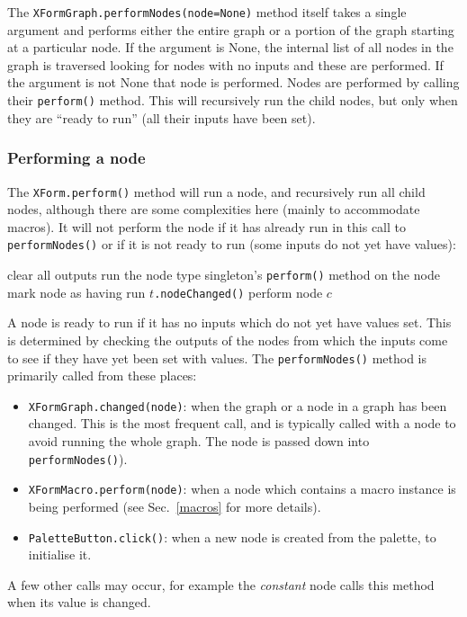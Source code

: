 The \texttt{XFormGraph.performNodes(node=None)} method itself takes a single
argument and performs either the entire graph or a portion of the graph
starting at a particular node. If the argument is None, the internal list of
all nodes in the graph is traversed looking for nodes with no inputs and these
are performed. If the argument is not None that node is performed. Nodes are
performed by calling their \texttt{perform()} method. This will recursively
run the child nodes, but only when they are ``ready to run'' (all their inputs
have been set). 

\subsubsection{Performing a node}
The \texttt{XForm.perform()} method will run a node, and recursively run all child nodes, although
there are some complexities here (mainly to accommodate macros). It will not perform the node if it 
has already run in this call to \texttt{performNodes()} or if it is not ready to run (some inputs do not yet have values):
\begin{algorithmic}
\STATE clear all outputs
\STATE run the node type singleton's \texttt{perform()} method on the node
\STATE mark node as having run
\STATE $t$\texttt{.nodeChanged()}
\ENDFOR
{}
\STATE perform node $c$
\ENDFOR
\ENDIF
\end{algorithmic}
A node is ready to run if it has no inputs which do not yet have values set. This is
determined by checking the outputs of the nodes from which the inputs come to see if
they have yet been set with values. The \texttt{performNodes()} method is primarily called from these places:
\begin{itemize}
\item \texttt{XFormGraph.changed(node)}: when the graph or a node in a graph has been changed. This is the most
frequent call, and is typically called with a node to avoid running the whole graph. The node is passed down into
\texttt{performNodes()}).
\item \texttt{XFormMacro.perform(node)}: when a node which contains a macro instance is being performed (see
Sec.~\ref{macros} for more details).
\item \texttt{PaletteButton.click()}: when a new node is created from the palette, to initialise it.
\end{itemize}
A few other calls may occur, for example the \emph{constant} node calls this method when its value is changed.
